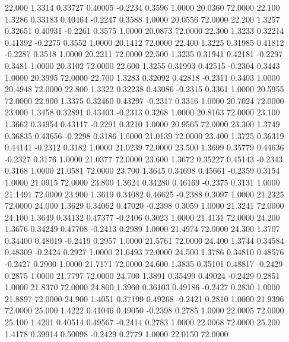   22.000   1.3314   0.33727   0.40005  -0.2234   0.3596   1.0000  20.0360  72.0000
  22.100   1.3286   0.33183   0.40464  -0.2247   0.3588   1.0000  20.0556  72.0000
  22.200   1.3257   0.32651   0.40931  -0.2261   0.3575   1.0000  20.0873  72.0000
  22.300   1.3233   0.32214   0.41392  -0.2275   0.3552   1.0000  20.1412  72.0000
  22.400   1.3225   0.31985   0.41812  -0.2287   0.3518   1.0000  20.2211  72.0000
  22.500   1.3235   0.31941   0.42181  -0.2297   0.3481   1.0000  20.3102  72.0000
  22.600   1.3255   0.31993   0.42515  -0.2304   0.3443   1.0000  20.3995  72.0000
  22.700   1.3283   0.32092   0.42818  -0.2311   0.3403   1.0000  20.4948  72.0000
  22.800   1.3322   0.32238   0.43086  -0.2315   0.3361   1.0000  20.5955  72.0000
  22.900   1.3375   0.32460   0.43297  -0.2317   0.3316   1.0000  20.7024  72.0000
  23.000   1.3458   0.32891   0.43403  -0.2313   0.3268   1.0000  20.8163  72.0000
  23.100   1.3662   0.34954   0.43117  -0.2291   0.3210   1.0000  20.9565  72.0000
  23.300   1.3749   0.36835   0.43656  -0.2298   0.3186   1.0000  21.0139  72.0000
  23.400   1.3725   0.36319   0.44141  -0.2312   0.3182   1.0000  21.0239  72.0000
  23.500   1.3699   0.35779   0.44636  -0.2327   0.3176   1.0000  21.0377  72.0000
  23.600   1.3672   0.35227   0.45143  -0.2343   0.3168   1.0000  21.0581  72.0000
  23.700   1.3645   0.34698   0.45661  -0.2359   0.3154   1.0000  21.0915  72.0000
  23.800   1.3624   0.34280   0.46169  -0.2375   0.3131   1.0000  21.1491  72.0000
  23.900   1.3619   0.34082   0.46625  -0.2388   0.3097   1.0000  21.2325  72.0000
  24.000   1.3629   0.34062   0.47020  -0.2398   0.3059   1.0000  21.3241  72.0000
  24.100   1.3649   0.34132   0.47377  -0.2406   0.3023   1.0000  21.4131  72.0000
  24.200   1.3676   0.34249   0.47708  -0.2413   0.2989   1.0000  21.4974  72.0000
  24.300   1.3707   0.34400   0.48019  -0.2419   0.2957   1.0000  21.5761  72.0000
  24.400   1.3744   0.34584   0.48309  -0.2424   0.2927   1.0000  21.6493  72.0000
  24.500   1.3786   0.34810   0.48576  -0.2427   0.2900   1.0000  21.7171  72.0000
  24.600   1.3835   0.35101   0.48817  -0.2429   0.2875   1.0000  21.7797  72.0000
  24.700   1.3891   0.35499   0.49024  -0.2429   0.2851   1.0000  21.8370  72.0000
  24.800   1.3960   0.36103   0.49186  -0.2427   0.2830   1.0000  21.8897  72.0000
  24.900   1.4051   0.37199   0.49268  -0.2421   0.2810   1.0000  21.9396  72.0000
  25.000   1.4222   0.41046   0.49050  -0.2398   0.2785   1.0000  22.0005  72.0000
  25.100   1.4201   0.40514   0.49567  -0.2414   0.2783   1.0000  22.0068  72.0000
  25.200   1.4178   0.39914   0.50098  -0.2429   0.2779   1.0000  22.0150  72.0000
